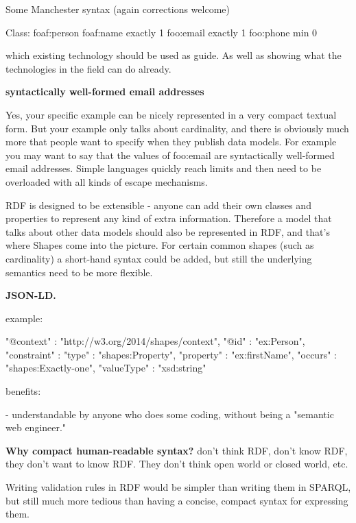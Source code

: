 \documentclass{llncs}
\newcommand{\tb}[1]{\todo[size=\small, color=green!40]{\textbf{Thomas:} #1}}
\begin{document}
Some Manchester syntax (again corrections welcome)

\begin{ex}
Class: foaf:person
   foaf:name exactly 1
   foo:email exactly 1
   foo:phone min 0
\end{ex}
 
which existing technology should be used as guide. 
As well as showing what the technologies in the field can do already.

\textbf{syntactically well-formed email addresses}

\tb{example}

Yes, your specific example can be 
nicely represented in a very compact textual form. But your example only 
talks about cardinality, and there is obviously much more that people 
want to specify when they publish data models. For example you may want 
to say that the values of foo:email are syntactically well-formed email 
addresses. Simple languages quickly reach limits and then need to be 
overloaded with all kinds of escape mechanisms. 

RDF is designed to be 
extensible - anyone can add their own classes and properties to 
represent any kind of extra information. Therefore a model that talks 
about other data models should also be represented in RDF, and that's 
where Shapes come into the picture. For certain common shapes (such as 
cardinality) a short-hand syntax could be added, but still the 
underlying semantics need to be more flexible.

\textbf{JSON-LD.}

example:

\begin{ex}
{
     "@context" : "http://w3.org/2014/shapes/context",
     "@id" : "ex:Person",
     "constraint" : {
         "type" : "shapes:Property",
         "property" : "ex:firstName",
         "occurs" : "shapes:Exactly-one",
         "valueType" : "xsd:string"
     }
}

\end{ex}

benefits:

- understandable by anyone who does some coding, without being a "semantic web engineer." 

\textbf{Why compact human-readable syntax?}
don't think RDF, don't know RDF, they don't want to know RDF.
They don't think open world or closed world, etc.

Writing validation rules in RDF would be simpler than writing them in SPARQL,
but still much more tedious than having a concise, compact syntax for
expressing them.
\end{document}
